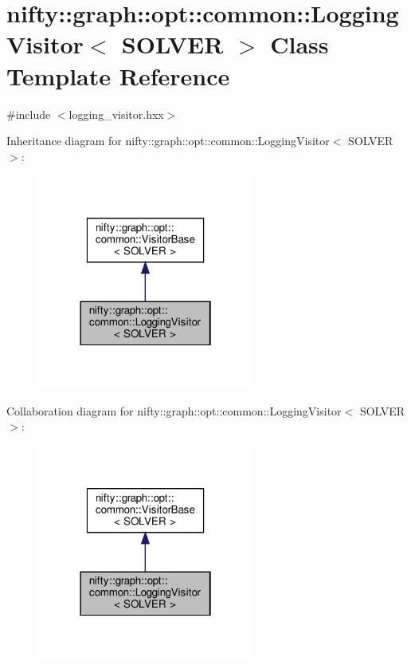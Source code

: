 \hypertarget{classnifty_1_1graph_1_1opt_1_1common_1_1LoggingVisitor}{}\section{nifty\+:\+:graph\+:\+:opt\+:\+:common\+:\+:Logging\+Visitor$<$ S\+O\+L\+V\+ER $>$ Class Template Reference}
\label{classnifty_1_1graph_1_1opt_1_1common_1_1LoggingVisitor}


{\ttfamily \#include $<$logging\+\_\+visitor.\+hxx$>$}



Inheritance diagram for nifty\+:\+:graph\+:\+:opt\+:\+:common\+:\+:Logging\+Visitor$<$ S\+O\+L\+V\+ER $>$\+:
\nopagebreak
\begin{figure}[H]
\begin{center}
\leavevmode
\includegraphics[width=202pt]{classnifty_1_1graph_1_1opt_1_1common_1_1LoggingVisitor__inherit__graph}
\end{center}
\end{figure}


Collaboration diagram for nifty\+:\+:graph\+:\+:opt\+:\+:common\+:\+:Logging\+Visitor$<$ S\+O\+L\+V\+ER $>$\+:
\nopagebreak
\begin{figure}[H]
\begin{center}
\leavevmode
\includegraphics[width=202pt]{classnifty_1_1graph_1_1opt_1_1common_1_1LoggingVisitor__coll__graph}
\end{center}
\end{figure}
